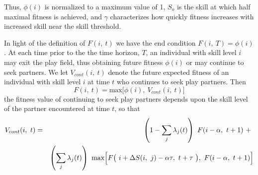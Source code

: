 \documentclass[12pt, letterpaper, fleqn]{article}
\begin{document}
	
	Thus, $\phi(i)$ is normalized to a maximum value of 1, $S_o$ is the skill at which half maximal fitness is achieved, and $\gamma$ characterizes how quickly fitness increases with increased skill near the skill threshold.
	
	
	In light of the definition of $F(i,~t)$ we have the end condition $F(i,~T) = \phi(i)$.
	At each time prior to the the time horizon, $T$, an individual with skill level $i$ may exit the play field, thus obtaining future fitness $\phi(i)$ or may continue to seek partners.  
	We let $V_{cont}(i,~t)$ denote the future expected fitness of an individual with skill level $i$ at time $t$ who continues to seek play partners.  
	Then   
	\begin{equation}
	F(i,~t)=\text{max} \big[\phi(i),~V_{cont}(i,~t)\big]                                                                      
	\label{breif}
	\end{equation}
	the fitness value of continuing to seek play partners depends upon the skill level of the partner encountered at time $t$, so that   
        \hspace{-1cm}
        \begin{eqnarray}
	\small
	V_{cont}(i,~t) &=& \left(1-\sum_j \lambda_j(t) \right) ~F(i-\alpha,~t+1) ~+~\\
	&&\left(\sum_j \lambda_j(t)\right)~\text{max} 
	\Big[F\big(~ i + \Delta S(i,~j) - \alpha \tau,~t+\tau ~\big),~F(i-\alpha,~t+1)\Big] \nonumber
	\end{eqnarray}
	
	
\end{document}
